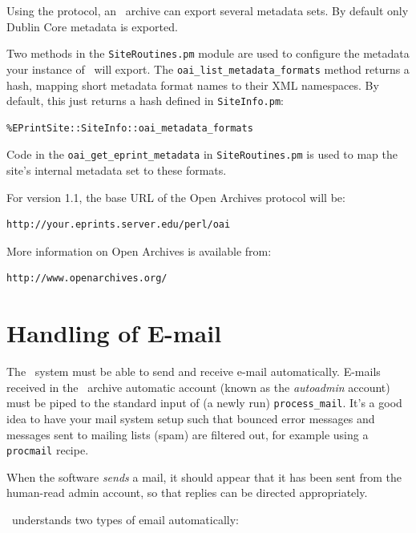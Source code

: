Using the protocol, an \eprints\ archive can export several metadata sets. By default only Dublin Core metadata is exported.

Two methods in the {\tt SiteRoutines.pm} module are used to configure the metadata your instance of \eprints\ will export. The {\tt oai\_list\_metadata\_formats} method returns a hash, mapping short metadata format names to their XML namespaces. By default, this just returns a hash defined in {\tt SiteInfo.pm}:

\begin{verbatim}
%EPrintSite::SiteInfo::oai_metadata_formats
\end{verbatim}

Code in the {\tt oai\_get\_eprint\_metadata} in {\tt SiteRoutines.pm} is used to map the site's internal metadata set to these formats.

For version 1.1, the base URL of the Open Archives protocol will be:

\begin{verbatim}
http://your.eprints.server.edu/perl/oai
\end{verbatim}

More information on Open Archives is available from:
\begin{verbatim}
http://www.openarchives.org/
\end{verbatim}


\section{Handling of E-mail}

The \eprints\ system must be able to send and receive e-mail automatically. E-mails received in the \eprints\ archive automatic account (known as the \emph{autoadmin} account) must be piped to the standard input of (a newly run) {\tt process\_mail}. It's a good idea to have your mail system setup such that bounced error messages and messages sent to mailing lists (spam) are filtered out, for example using a {\tt procmail} recipe.

When the software \emph{sends} a mail, it should appear that it has been sent from the human-read admin account, so that replies can be directed appropriately.

\eprints\ understands two types of email automatically:

